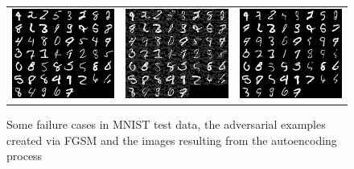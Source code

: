 \documentclass[twoside]{article}
\theoremstyle{definition}
\begin{document}
\begin{figure}[H]
\centering
\begin{tabular}{ccc}
\includegraphics[width=2in]{cl_original.png} &
\includegraphics[width=2in]{cl_adversarial.png} &
\includegraphics[width=2in]{cl_reconstr.png}
\end{tabular}
\caption{Some failure cases in MNIST test data, the adversarial examples created via FGSM and the images resulting from the autoencoding process}
\end{figure}
\end{document}
